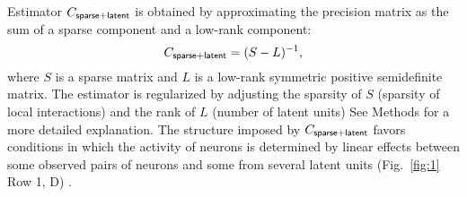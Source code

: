 Estimator $C_{\sf sparse+latent}$ is obtained by approximating the precision matrix as the sum of a sparse component and a low-rank component:
\begin{equation}\label{eq:c-sl}
C_{\sf sparse+latent} = (S - L)^{-1},
\end{equation}
where $S$ is a sparse matrix and $L$ is a low-rank symmetric positive semidefinite matrix. 
The estimator is regularized by adjusting the sparsity of $S$ (sparsity of local interactions) and the rank of $L$ (number of latent units) 
See Methods for a more detailed explanation. 
The structure imposed by $C_{\sf sparse+latent}$ favors conditions in which the activity of neurons is determined by linear effects between some observed pairs of neurons and some from several latent units (Fig.~\ref{fig:1} Row 1, D) \citep{Chandrasekaran:2010,Ma:2013}.
